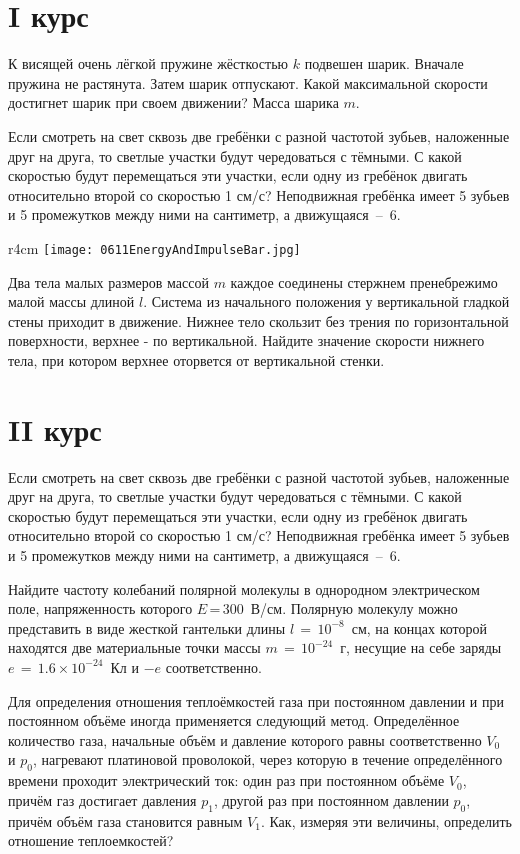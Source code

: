 \section{I курс}

\AddProb К висящей очень лёгкой пружине жёсткостью $k$ подвешен шарик. Вначале пружина 
не растянута. Затем шарик отпускают. Какой максимальной скорости достигнет шарик 
при своем движении? Масса шарика $m$.

\AddProb Если смотреть на свет сквозь две гребёнки с разной частотой зубьев, наложенные 
друг на друга, то светлые участки будут чередоваться с тёмными. С какой скоростью 
будут перемещаться эти участки, если одну из гребёнок двигать относительно второй со 
скоростью 1 см/с? Неподвижная гребёнка имеет 5 зубьев и 5 промежутков между ними на 
сантиметр, а движущаяся~--~6.

\begin{wrapfigure}{r}{4cm}
\texttt{[image: 0611EnergyAndImpulseBar.jpg]}
\end{wrapfigure}

\AddProb Два тела малых размеров массой $m$ каждое соединены стержнем пренебрежимо малой массы длиной $l$. 
Система из начального положения у вертикальной гладкой стены приходит в движение. 
Нижнее тело скользит без трения по горизонтальной поверхности, верхнее - по вертикальной. 
Найдите значение скорости нижнего тела, при котором верхнее оторвется от вертикальной стенки.


\section{II курс}

\AddProb Если смотреть на свет сквозь две гребёнки с разной частотой зубьев, наложенные 
друг на друга, то светлые участки будут чередоваться с тёмными. С какой скоростью 
будут перемещаться эти участки, если одну из гребёнок двигать относительно второй со 
скоростью 1 см/с? Неподвижная гребёнка имеет 5 зубьев и 5 промежутков между ними на 
сантиметр, а движущаяся~--~6.

\AddProb Найдите частоту колебаний полярной молекулы в однородном электрическом поле, напряженность которого $E$\,=\,300~В/см. 
Полярную молекулу можно представить в виде жесткой гантельки длины $l\,=\,10^{-8}$~см, на концах которой находятся две материальные точки 
массы $m\,=\,10^{-24}$~г, несущие на себе заряды $e\,=\,1.6\times10^{-24}$~Кл и $-e$ соответственно. 

\AddProb Для определения отношения теплоёмкостей газа при постоянном давлении и при 
постоянном объёме иногда применяется следующий метод. Определённое количество газа, 
начальные объём и давление которого равны соответственно $V_0$ и $p_0$, нагревают 
платиновой проволокой, через которую в течение определённого времени проходит 
электрический ток: один раз при постоянном объёме $V_0$, причём газ достигает давления $p_1$, 
другой раз при постоянном давлении $p_0$, причём объём газа становится равным $V_1$. Как, 
измеряя эти величины, определить отношение теплоемкостей?


